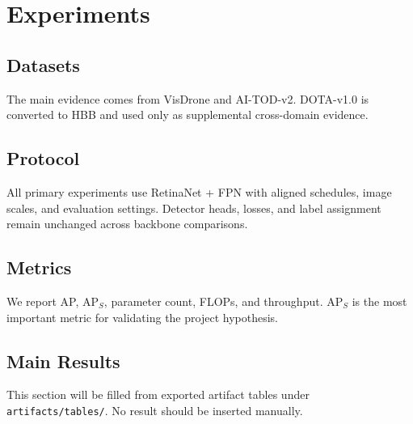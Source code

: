 \section{Experiments}

\subsection{Datasets}

The main evidence comes from VisDrone and AI-TOD-v2. DOTA-v1.0 is converted to HBB and used only as supplemental cross-domain evidence.

\subsection{Protocol}

All primary experiments use RetinaNet + FPN with aligned schedules, image scales, and evaluation settings. Detector heads, losses, and label assignment remain unchanged across backbone comparisons.

\subsection{Metrics}

We report AP, AP$_S$, parameter count, FLOPs, and throughput. AP$_S$ is the most important metric for validating the project hypothesis.

\subsection{Main Results}

This section will be filled from exported artifact tables under \texttt{artifacts/tables/}. No result should be inserted manually.

